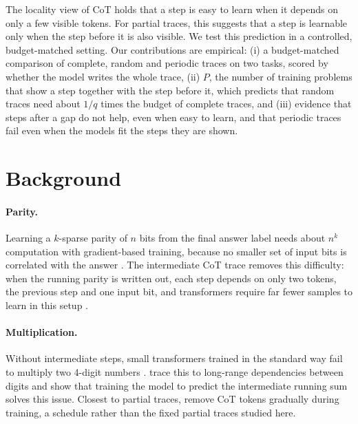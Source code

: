 \documentclass{article}
\begin{document}
The locality view of CoT \citep{wen2025sparse,abbe2024globality} holds that a
step is easy to learn when it depends on only a few visible tokens. For
partial traces, this suggests that a step is learnable only when the step
before it is also visible. We test this prediction in a controlled,
budget-matched setting. Our contributions are empirical:
(i) a budget-matched comparison of complete, random and periodic traces on
two tasks, scored by whether the model writes the whole trace,
(ii) $P$, the number of training problems that show a step together with the
step before it, which predicts that random traces need about $1/q$ times the
budget of complete traces, and
(iii) evidence that steps after a gap do not help, even when easy to learn,
and that periodic traces fail even when the models fit the steps they are
shown.

\section{Background}
\label{sec:background}

\paragraph{Parity.}
Learning a $k$-sparse parity of $n$ bits from the final answer label needs about
$n^{k}$ computation with gradient-based training, because no smaller set of
input bits is correlated with the answer \citep{barak2022hidden}. The intermediate
CoT trace removes this difficulty: when the running parity is written out, each
step depends on only two tokens, the previous step and one input bit, and
transformers require far fewer samples to learn in this setup \citep{wen2025sparse}.

\paragraph{Multiplication.}
Without intermediate steps, small transformers trained in the standard way
fail to multiply two 4-digit numbers \citep{deng2023implicit,deng2024explicit}.
\citet{bai2025multiplication} trace this to long-range dependencies between
digits and show that training the model to predict the intermediate running sum
solves this issue. Closest to partial traces, \citet{deng2024explicit} remove CoT tokens
gradually during training, a schedule rather than the fixed partial traces
studied here.
\end{document}
